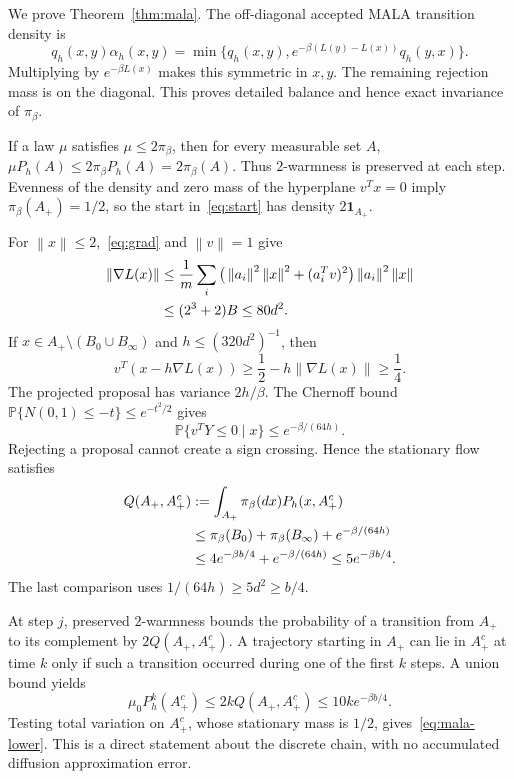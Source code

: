 \documentclass[11pt,letterpaper]{article}
\numberwithin{equation}{section}
\theoremstyle{remark}
\newcommand{\Prb}{\mathbb P}
\newcommand{\1}{\mathbf 1}
\newcommand{\norm}[1]{\left\lVert#1\right\rVert}
\begin{document}
We prove Theorem~\ref{thm:mala}. The off-diagonal accepted MALA transition density is
\begin{equation}\label{eq:accepted}
 q_h(x,y)\alpha_h(x,y)
 =\min\{q_h(x,y),e^{-\beta(L(y)-L(x))}q_h(y,x)\}.
\end{equation}
Multiplying by $e^{-\beta L(x)}$ makes this symmetric in $x,y$. The remaining rejection mass is on the diagonal. This proves detailed balance and hence exact invariance of $\pi_\beta$.

If a law $\mu$ satisfies $\mu\le2\pi_\beta$, then for every measurable set $A$,
$\mu P_h(A)\le2\pi_\beta P_h(A)=2\pi_\beta(A)$.
Thus $2$-warmness is preserved at each step. Evenness of the density and zero mass of the hyperplane $v^Tx=0$ imply $\pi_\beta(A_+)=1/2$, so the start in~\eqref{eq:start} has density $2\1_{A_+}$.

For $\norm x\le2$,~\eqref{eq:grad} and $\norm v=1$ give
\begin{align}
 \norm{\nabla L(x)}
 &\le\frac1m\sum_i
 \big(\norm{a_i}^2\norm x^2+(a_i^Tv)^2\big)
       \norm{a_i}^2\norm x\notag\\
 &\le(2^3+2)B\le80d^2.\label{eq:gradball}
\end{align}
If $x\in A_+\setminus(B_0\cup B_\infty)$ and $h\le(320d^2)^{-1}$, then
\[
 v^T(x-h\nabla L(x))\ge\frac12-h\norm{\nabla L(x)}\ge\frac14.
\]
The projected proposal has variance $2h/\beta$. The Chernoff bound $\Prb\{N(0,1)\le-t\}\le e^{-t^2/2}$ gives
\begin{equation}\label{eq:crossing}
 \Prb\{v^TY\le0\mid x\}\le e^{-\beta/(64h)}.
\end{equation}
Rejecting a proposal cannot create a sign crossing. Hence the stationary flow satisfies
\begin{align}
 Q(A_+,A_+^c)
 &:=\int_{A_+}\pi_\beta(dx)P_h(x,A_+^c)\notag\\
 &\le\pi_\beta(B_0)+\pi_\beta(B_\infty)+e^{-\beta/(64h)}\notag\\
 &\le4e^{-\beta b/4}+e^{-\beta/(64h)}
 \le5e^{-\beta b/4}.\label{eq:flow}
\end{align}
The last comparison uses $1/(64h)\ge5d^2\ge b/4$.

At step $j$, preserved $2$-warmness bounds the probability of a transition from $A_+$ to its complement by $2Q(A_+,A_+^c)$. A trajectory starting in $A_+$ can lie in $A_+^c$ at time $k$ only if such a transition occurred during one of the first $k$ steps. A union bound yields
\[
 \mu_0P_h^k(A_+^c)\le2kQ(A_+,A_+^c)
 \le10k e^{-\beta b/4}.
\]
Testing total variation on $A_+^c$, whose stationary mass is $1/2$, gives~\eqref{eq:mala-lower}. This is a direct statement about the discrete chain, with no accumulated diffusion approximation error.
\end{document}
